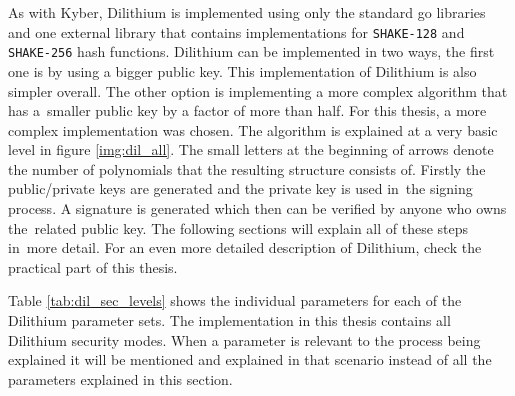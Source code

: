 As with Kyber, Dilithium is implemented using only the standard go libraries and one external library \cite{00fV2cvg7Z6H2tS3} that contains implementations for \texttt{SHAKE-128} and \texttt{SHAKE-256} hash functions. Dilithium can be implemented in two ways, the first one is by using a bigger public key. This implementation of Dilithium is also simpler overall. The other option is implementing a more complex algorithm that has a~smaller public key by a factor of more than half. For this thesis, a more complex implementation was chosen. The algorithm is explained at a very basic level in figure \ref{img:dil_all}. The small letters at the beginning of arrows denote the number of polynomials that the resulting structure consists of. Firstly the public/private keys are generated and the private key is used in~the signing process. A signature is generated which then can be verified by anyone who owns the~related public key. The following sections will explain all of these steps in~more detail. For an even more detailed description of Dilithium, check the practical part of this thesis.


Table \ref{tab:dil_sec_levels} shows the individual parameters for each of the Dilithium parameter sets. The implementation in this thesis contains all Dilithium security modes. When a parameter is relevant to the process being explained it will be mentioned and explained in that scenario instead of all the parameters explained in this section.
